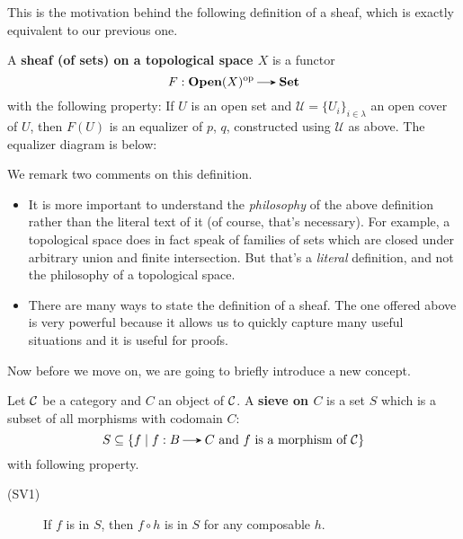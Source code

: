 This is the motivation behind the following definition of a sheaf, which is exactly equivalent to 
our previous one.

\begin{definition}
    A \textbf{sheaf (of sets) on a topological space $X$}
    is a functor 
    \[
        F: \textbf{Open}(X)\op \to \textbf{Set}
    \]
    with the following property: If $U$ is an open set 
    and $\mathcal{U} = \{U_i\}_{i \in \lambda}$ an open cover of $U$,
    then $F(U)$ is an equalizer of $p$, $q$, constructed using $\mathcal{U}$ 
    as above. The equalizer diagram is below:
    \begin{center}
    \end{center}
\end{definition}

We remark two comments on this definition.

\begin{itemize}
    \item It is more important to understand the \emph{philosophy} of the above 
    definition rather than the literal text of it (of course, that's necessary).
    For example, a topological 
    space does in fact speak of families of sets which are closed under 
    arbitrary union and finite intersection. But that's a \emph{literal} definition, 
    and not the philosophy of a topological space.
    \item 
    There are many ways to state the definition of a sheaf. The one 
    offered above is very powerful because it allows us to quickly 
    capture many useful situations and it is useful for proofs.
\end{itemize}

Now before we move on, we are going to briefly introduce a new concept. 
\begin{definition}
    Let $\mathcal{C}$ be a category and $C$ an object of $\mathcal{C}$. 
    A \textbf{sieve on $C$}
    is a set $S$ which is a subset of all morphisms with codomain $C$:
    \[
        S \subset \{f \mid f: B \to C \text{ and } f \text{ is a morphism of }\cc \}
    \]
    with following property.
    \begin{description}
        \item[(SV1)] If $f$ is in $S$, then $f \circ h$ is in $S$ for any composable 
        $h$.
    \end{description}
\end{definition}

